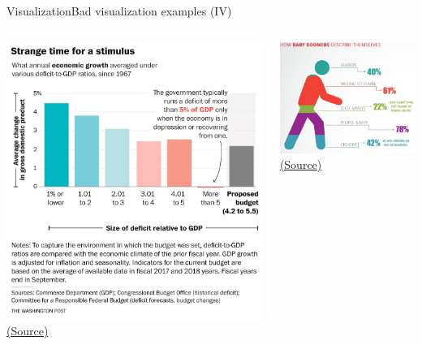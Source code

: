 \documentclass[10pt,compress]{beamer} %
\begin{document}
\begin{frame}{Visualization}{Bad visualization examples (IV)}
	\begin{columns}
	\centering \includegraphics[width=\textwidth]{figs/bad10.png}\\
	\centering \tiny \href{http://viz.wtf/}{(Source)}

	\centering \includegraphics[width=\textwidth]{figs/bad7.jpg}\\
	\centering \tiny \href{http://livingqlikview.com/the-9-worst-data-visualizations-ever-created/}{(Source)}
	\end{columns}
\end{frame}
\end{document}
